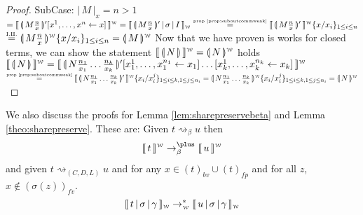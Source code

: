 \documentclass[a4paper,UKenglish,cleveref, autoref]{lipics-v2019}
\newcommand{\fv}[1]{(#1)_{fv}}
\newcommand{\bv}[1]{(#1)_{bv}}
\newcommand{\fp}[1]{(#1)_{fp}}
\newcommand{\share}[3]{#1 [#2 \leftarrow #3]}
\newcommand{\size}[1]{\vert \, #1 \, \vert}
\newcommand{\sub}[3]{#1 \{ #2 / #3 \}}
\newcommand{\compile}[1]{\llparenthesis \, #1 \, \rrparenthesis}
\newcommand{\weaksymbol}{\mbox{\tiny $\mathcal{W}$}}
\newcommand{\readweakwmap}[3]{\llbracket \, #1 \, \vert \, #2 \, \vert \, #3  \, \rrbracket_{\weaksymbol} }
\newcommand{\compweak}[1]{\llparenthesis \, #1 \, \rrparenthesis^{\weaksymbol}}
\newcommand{\composeweak}[1]{\llbracket \, #1 \, \rrbracket^{\weaksymbol}}
\newcommand{\byprop}[1]{\stackrel{\hbox{\tiny #1}}{\hbox{=}}}
\newcommand{\IH}{\stackrel{\hbox{\tiny I.H.}}{\hbox{=}}}
\begin{document}
\begin{proof}
\indent SubCase: $\size{M}_{x} = n > 1$
\newline
\indent $= \composeweak{\compile{M \frac{n}{x} }' \share{}{x^{1}, \dots, x^{n}}{x}} = \readweakwmap{\compile{M \frac{n}{x} }' }{\sigma}{I} \byprop{prop \ref{prop:suboutcommweak}} \composeweak{\compile{M \frac{n}{x}}'} \sub{}{x}{x_{i}}_{1 \leq i \leq n}$
\newline
\indent $\IH \compweak{M \frac{n}{x}} \sub{}{x}{x_{i}}_{1 \leq i \leq n} = \compweak{M}$
\newline
\newline
Now that we have proven is works for closed terms, we can show the statement $\composeweak{\compile{N}} = \compweak{N}$ holds
\newline
\newline
$\composeweak{\compile{N}} =  \composeweak{\compile{N \frac{n_{1}}{x_{1}} \dots \frac{n_{k}}{x_{k}}}' \share{}{x^{1}_{1}, \dots, x^{n_{1}}_{1}}{x_{1}} \dots \share{}{x^{1}_{k}, \dots, x^{n_{k}}_{k}}{x_{k}} }$
\newline
$\byprop{prop \ref{prop:suboutcommweak}} \composeweak{\compile{N \frac{n_{1}}{x_{1}} \dots \frac{n_{k}}{x_{k}}}' } \sub{}{x_{i}}{x^{j}_{i}}_{1 \leq i \leq k, 1 \leq j \leq n_{i}} = \compweak{N \frac{n_{1}}{x_{1}} \dots \frac{n_{k}}{x_{k}}}\sub{}{x_{i}}{x^{j}_{i}}_{1 \leq i \leq k, 1 \leq j \leq n_{i}} = \compweak{N}$
\end{proof}

We also discuss the proofs for Lemma \ref{lem:sharepreservebeta} and Lemma \ref{theo:sharepreserve}. These are:
	Given $t \rightsquigarrow_{\beta} u$ then $$\composeweak{t} \rightarrow^{\plus}_{\beta} \composeweak{u}$$
and given $t \rightsquigarrow_{(C, D, L)} u$ and for any $x \in \bv{t} \cup \fp{t}$ and for all $z$, $x \not\in \fv{\sigma(z)}$.  $$\readweakwmap{t}{\sigma}{\gamma} \rightarrow^{*}_{\weaksymbol} \readweakwmap{u}{\sigma}{\gamma}$$
\end{document}
